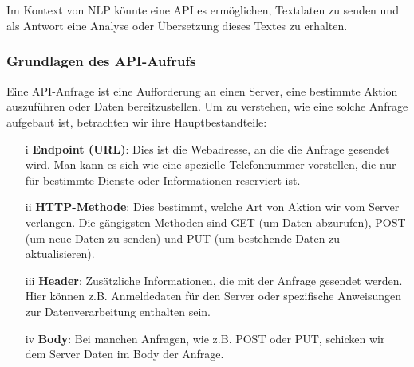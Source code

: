\documentclass[12pt,a4paper]{article}
\begin{document}
\ \\ \\
\ \\ \\
Im Kontext von NLP könnte eine API es ermöglichen, Textdaten zu senden und als Antwort eine Analyse oder Übersetzung dieses Textes zu erhalten.
\ \\
\begin{center}
\end{center}

\subsubsection{Grundlagen des API-Aufrufs}
Eine API-Anfrage ist eine Aufforderung an einen Server, eine bestimmte Aktion auszuführen oder Daten bereitzustellen. Um zu verstehen, wie eine solche Anfrage aufgebaut ist, betrachten wir ihre Hauptbestandteile:
\begin{enumerate}
	\item[i] \textbf{Endpoint (URL)}: Dies ist die Webadresse, an die die Anfrage gesendet wird. Man kann es sich wie eine spezielle Telefonnummer vorstellen, die nur für bestimmte Dienste oder Informationen reserviert ist.
	\item[ii] \textbf{HTTP-Methode}: Dies bestimmt, welche Art von Aktion wir vom Server verlangen. Die gängigsten Methoden sind GET (um Daten abzurufen), POST (um neue Daten zu senden) und PUT (um bestehende Daten zu aktualisieren).
	\item[iii]  \textbf{Header}: Zusätzliche Informationen, die mit der Anfrage gesendet werden. Hier können z.B. Anmeldedaten für den Server oder spezifische Anweisungen zur Datenverarbeitung enthalten sein.
	\item[iv]  \textbf{Body}: Bei manchen Anfragen, wie z.B. POST oder PUT, schicken wir dem Server Daten im Body der Anfrage.
\end{enumerate}
\end{document}
